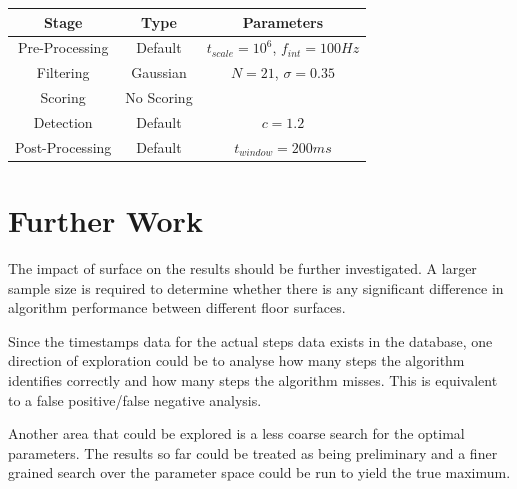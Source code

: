                 \begin{center}
                    \label{tbl_params_back_pocket}
                    \begin{tabular}{|c|c|c|}
                        \hline
                        Stage & Type & Parameters \\
                        \hline
                        Pre-Processing & Default & $t_{scale}=10^6$, $f_{int}=100Hz$ \\
                        Filtering & Gaussian & $N=21$, $\sigma=0.35$ \\
                        Scoring & No Scoring & \\
                        Detection & Default & $c=1.2$ \\
                        Post-Processing & Default & $t_{window}=200ms$ \\
                        \hline
                    \end{tabular}
                \end{center}



    \chapter{Further Work}
        The impact of surface on the results should be further investigated. A larger sample size is required to determine whether there is any significant difference in algorithm performance between different floor surfaces.

        Since the timestamps data for the actual steps data exists in the database, one direction of exploration could be to analyse how many steps the algorithm identifies correctly and how many steps the algorithm misses. This is equivalent to a false positive/false negative analysis.

        Another area that could be explored is a less coarse search for the optimal parameters. The results so far could be treated as being preliminary and a finer grained search over the parameter space could be run to yield the true maximum.